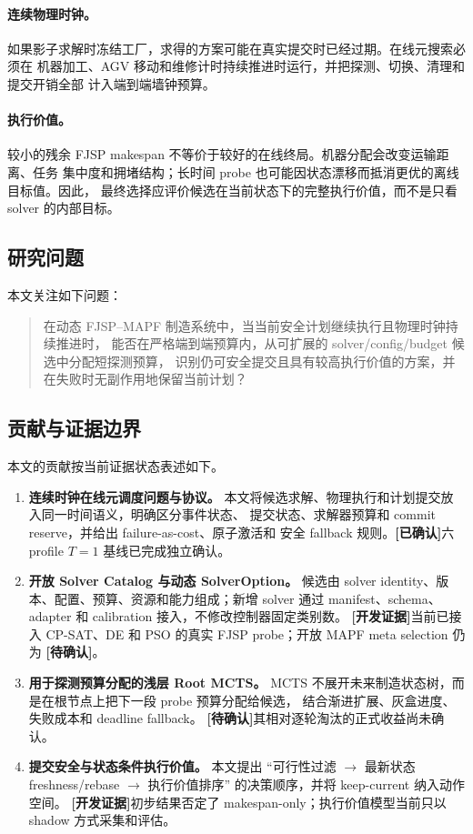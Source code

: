 \documentclass[11pt,a4paper]{article}
\newcommand{\confirmed}{\textcolor{green!45!black}{\textbf{[已确认]}}}
\newcommand{\development}{\textcolor{orange!80!black}{\textbf{[开发证据]}}}
\newcommand{\pending}{\textcolor{red!70!black}{\textbf{[待确认]}}}
\begin{document}
\paragraph{连续物理时钟。}
如果影子求解时冻结工厂，求得的方案可能在真实提交时已经过期。在线元搜索必须在
机器加工、AGV 移动和维修计时持续推进时运行，并把探测、切换、清理和提交开销全部
计入端到端墙钟预算。

\paragraph{执行价值。}
较小的残余 FJSP makespan 不等价于较好的在线终局。机器分配会改变运输距离、任务
集中度和拥堵结构；长时间 probe 也可能因状态漂移而抵消更优的离线目标值。因此，
最终选择应评价候选在当前状态下的完整执行价值，而不是只看 solver 的内部目标。

\subsection{研究问题}

本文关注如下问题：

\begin{quote}
在动态 FJSP--MAPF 制造系统中，当当前安全计划继续执行且物理时钟持续推进时，
能否在严格端到端预算内，从可扩展的 solver/config/budget 候选中分配短探测预算，
识别仍可安全提交且具有较高执行价值的方案，并在失败时无副作用地保留当前计划？
\end{quote}

\subsection{贡献与证据边界}

本文的贡献按当前证据状态表述如下。

\begin{enumerate}
    \item \textbf{连续时钟在线元调度问题与协议。}
    本文将候选求解、物理执行和计划提交放入同一时间语义，明确区分事件状态、
    提交状态、求解器预算和 commit reserve，并给出 failure-as-cost、原子激活和
    安全 fallback 规则。\confirmed 六 profile \(T=1\) 基线已完成独立确认。

    \item \textbf{开放 Solver Catalog 与动态 SolverOption。}
    候选由 solver identity、版本、配置、预算、资源和能力组成；新增 solver 通过
    manifest、schema、adapter 和 calibration 接入，不修改控制器固定类别数。
    \development 当前已接入 CP-SAT、DE 和 PSO 的真实 FJSP probe；开放 MAPF
    meta selection 仍为 \pending。

    \item \textbf{用于探测预算分配的浅层 Root MCTS。}
    MCTS 不展开未来制造状态树，而是在根节点上把下一段 probe 预算分配给候选，
    结合渐进扩展、灰盒进度、失败成本和 deadline fallback。
    \pending 其相对逐轮淘汰的正式收益尚未确认。

    \item \textbf{提交安全与状态条件执行价值。}
    本文提出 ``可行性过滤 \(\rightarrow\) 最新状态 freshness/rebase
    \(\rightarrow\) 执行价值排序'' 的决策顺序，并将 keep-current 纳入动作空间。
    \development 初步结果否定了 makespan-only；执行价值模型当前只以 shadow
    方式采集和评估。
\end{enumerate}
\end{document}
